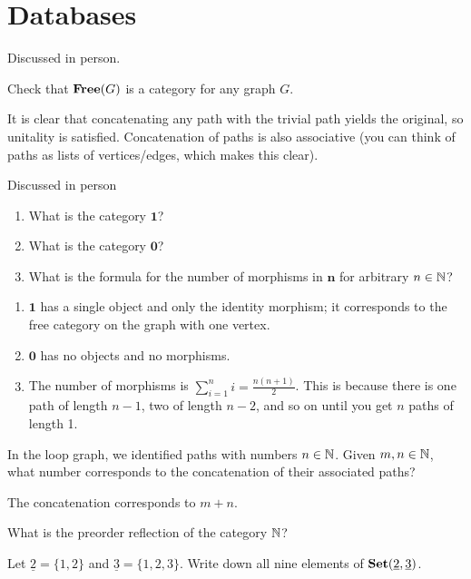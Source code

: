 \chapter{Databases}

Discussed in person.

Check that $\textbf{Free}(G)$ is a category for any graph $G$.

\solution
It is clear that concatenating any path with the trivial path yields the original, so unitality is satisfied.  Concatenation of paths is also associative (you can think of paths as lists of vertices/edges, which makes this clear).

Discussed in person

\begin{enumerate}
	\item What is the category $\textbf{1}$?
	\item What is the category $\textbf{0}$?
	\item What is the formula for the number of morphisms in $\textbf{n}$ for arbitrary $n\in\mathbb{N}$?
\end{enumerate}

\solution
\begin{enumerate}
	\item $\textbf{1}$ has a single object and only the identity morphism; it corresponds to the free category on the graph with one vertex.
	\item $\textbf{0}$ has no objects and no morphisms.
	\item The number of morphisms is $\sum_{i=1}^n i = \frac{n(n+1)}{2}$.  This is because there is one path of length $n-1$, two of length $n-2$, and so on until you get $n$ paths of length 1.
\end{enumerate}

In the loop graph, we identified paths with numbers $n\in\mathbb{N}$.  Given $m,n\in\mathbb{N}$, what number corresponds to the concatenation of their associated paths?

\solution
The concatenation corresponds to $m+n$.









What is the preorder reflection of the category $\mathbb{N}$?

Let $\underline{2}=\{1,2\}$ and $\underline{3}=\{1,2,3\}$.  Write down all nine elements of $\textbf{Set}(\underline{2},\underline{3})$.

